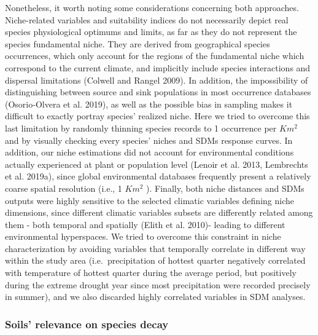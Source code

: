\documentclass[11pt,twoside]{reedthesis}
\begin{document}
Nonetheless, it worth noting some considerations concerning both
approaches. Niche-related variables and suitability indices do not
necessarily depict real species physiological optimums and limits, as
far as they do not represent the species fundamental niche. They are
derived from geographical species occurrences, which only account for
the regions of the fundamental niche which correspond to the current
climate, and implicitly include species interactions and dispersal
limitations (Colwell and Rangel 2009). In addition, the impossibility of
distinguishing between source and sink populations in most occurrence
databases (Osorio‐Olvera et al. 2019), as well as the possible bias in
sampling makes it difficult to exactly portray species' realized niche.
Here we tried to overcome this last limitation by randomly thinning
species records to 1 occurrence per \(Km^2\) and by visually checking
every species' niches and SDMs response curves. In addition, our niche
estimations did not account for environmental conditions actually
experienced at plant or population level (Lenoir et al. 2013, Lembrechts
et al. 2019a), since global environmental databases frequently present a
relatively coarse spatial resolution (i.e., 1 \(Km^2\) ). Finally, both
niche distances and SDMs outputs were highly sensitive to the selected
climatic variables defining niche dimensions, since different climatic
variables subsets are differently related among them - both temporal and
spatially (Elith et al. 2010)- leading to different environmental
hyperspaces. We tried to overcome this constraint in niche
characterization by avoiding variables that temporally correlate in
different way within the study area (i.e.~precipitation of hottest
quarter negatively correlated with temperature of hottest quarter during
the average period, but positively during the extreme drought year since
most precipitation were recorded precisely in summer), and we also
discarded highly correlated variables in SDM analyses.\par

\subsubsection{Soils' relevance on species
decay}\label{soils-relevance-on-species-decay}
\end{document}
